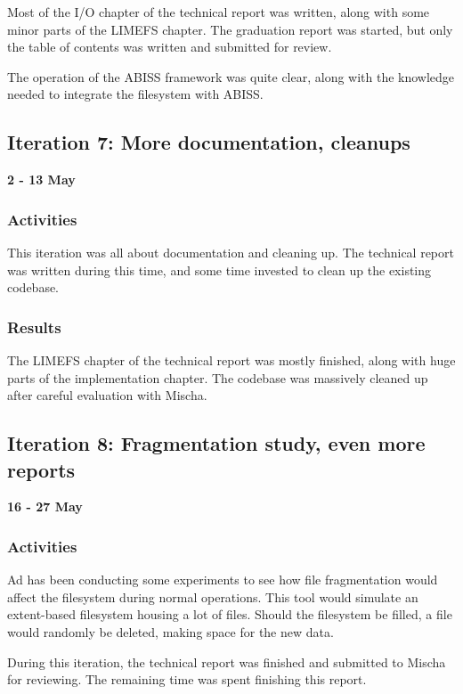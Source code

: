 Most of the I/O chapter of the technical report was written, along with some minor parts of the LIMEFS chapter. The graduation report was started, but only the table of contents was written and submitted for review.

The operation of the ABISS framework was quite clear, along with the knowledge needed to integrate the filesystem with ABISS.

\subsection{Iteration 7: More documentation, cleanups}

\textbf{2 - 13 May}

\subsubsection{Activities}

This iteration was all about documentation and cleaning up. The technical report was written during this time, and some time invested to clean up the existing codebase.

\subsubsection{Results}

The LIMEFS chapter of the technical report was mostly finished, along with huge parts of the implementation chapter. The codebase was massively cleaned up after careful evaluation with Mischa.

\subsection{Iteration 8: Fragmentation study, even more reports}

\textbf{16 - 27 May}

\subsubsection{Activities}

Ad has been conducting some experiments to see how file fragmentation would affect the filesystem during normal operations. This tool would simulate an extent-based filesystem housing a lot of files. Should the filesystem be filled, a file would randomly be deleted, making space for the new data.

During this iteration, the technical report was finished and submitted to Mischa for reviewing. The remaining time was spent finishing this report.

